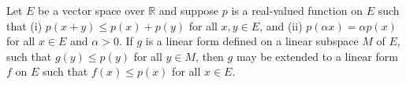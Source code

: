 Let $E$ be a vector space over $\mathbb{R}$ and suppose $p$ is a real-valued function on $E$ such that (i) $p(x + y) \leq p(x) + p(y)$ for all $x, y \in E$, and (ii) $p(\alpha x) = \alpha p(x)$ for all $x \in E$ and $\alpha > 0$. If $g$ is a linear form defined on a linear subspace $M$ of $E$, such that $g(y) \leq p(y)$ for all $y \in M$, then $g$ may be extended to a linear form $f$ on $E$ such that $f(x) \leq p(x)$ for all $x \in E$.